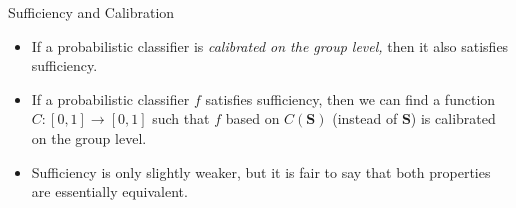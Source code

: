 \begin{vbframe}{Sufficiency and Calibration}
{\begin{itemize}
\begin{align*}
				\P(  y = 1 ~|~ \mathbf{S} = s, \sens = \ba ) &= \P(  y = 1 ~|~  \mathbf{S} = s, \sens = \batilde ) \tag{sufficiency} \\
				&\mbox{vs.} \\
				\P(  y = 1 ~|~ \mathbf{S} = s, \sens = \ba  ) &= s \tag{calibration on individual level}
			\end{align*}
%		
			\item If a probabilistic classifier is \emph{calibrated on the group level,} then it also satisfies sufficiency.
%			
			\item If a probabilistic classifier $f$ satisfies sufficiency, then we can find a function $C:[0,1] \to [0,1]$ such that $f$ based on $C(\mathbf{S})$ (instead of $\mathbf{S}$) is calibrated on the group level.
%			
			\item Sufficiency is only slightly weaker, but it is fair to say that both properties are essentially equivalent.
%			
		\end{itemize}
	}
\end{vbframe}



